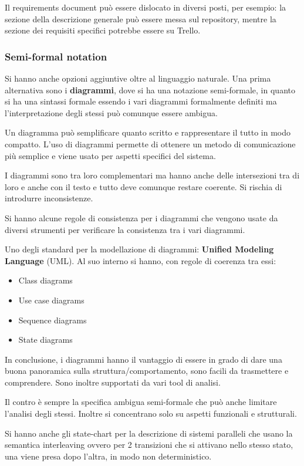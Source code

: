 Il requirements document può essere dislocato in diversi posti, per esempio:
la sezione della descrizione generale può essere messa sul repository, mentre
la sezione dei requisiti specifici potrebbe essere su Trello.
\subsubsection{Semi-formal notation}
Si hanno anche opzioni aggiuntive oltre al linguaggio naturale. Una prima
alternativa sono i \textbf{diagrammi}, dove si ha una notazione semi-formale, in
quanto si ha una sintassi formale essendo i vari diagrammi formalmente definiti
ma l'interpretazione degli stessi può comunque essere ambigua.

Un diagramma può semplificare  quanto scritto e rappresentare il tutto in modo
compatto. L'uso di diagrammi permette di ottenere un metodo di comunicazione più
semplice e viene usato per aspetti specifici del sistema.

I diagrammi sono tra loro complementari ma hanno anche delle intersezioni tra di
loro e anche con il testo e tutto deve comunque restare coerente. Si rischia di
introdurre inconsistenze.

Si hanno alcune regole di consistenza per i diagrammi che vengono usate da diversi
strumenti per verificare la consistenza tra i vari diagrammi.

Uno degli standard per la modellazione di diagrammi: \textbf{Unified Modeling
      Language} (UML). Al suo interno si hanno, con regole di coerenza tra essi:
\begin{itemize}
      \item Class diagrams
      \item Use case diagrams
      \item Sequence diagrams
      \item State diagrams
\end{itemize}
In conclusione, i diagrammi hanno il vantaggio di essere in grado di dare una
buona panoramica sulla struttura/comportamento, sono facili da trasmettere e
comprendere. Sono inoltre supportati da vari tool di analisi.

Il contro è sempre la specifica ambigua semi-formale che può anche limitare
l'analisi degli stessi. Inoltre si concentrano solo su aspetti funzionali e
strutturali.

Si hanno anche gli state-chart per la descrizione di sistemi paralleli che usano
la semantica interleaving ovvero per 2 transizioni che si attivano nello stesso
stato, una viene presa dopo l'altra, in modo non deterministico.
